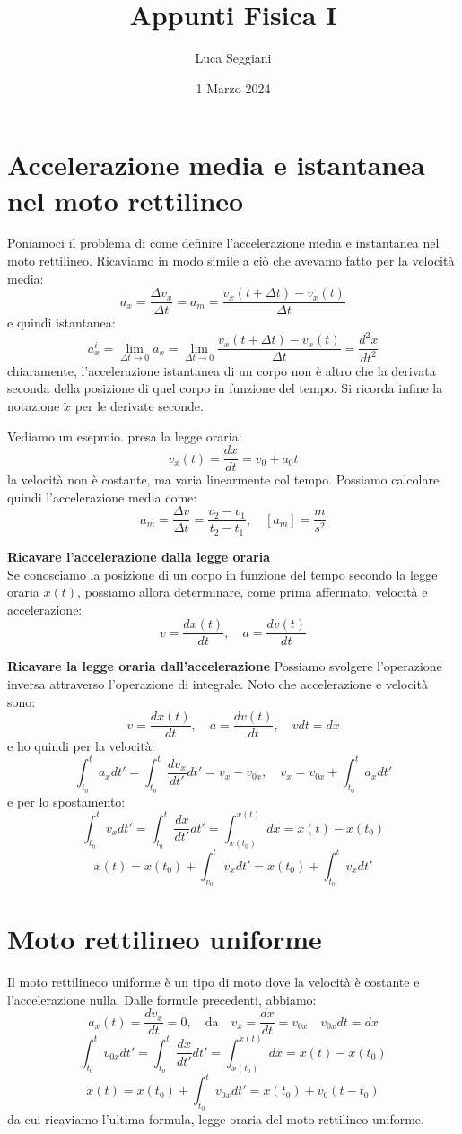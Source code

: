 \documentclass[a4paper,12pt]{article}
\title{Appunti Fisica I}
\author{Luca Seggiani}
\date{1 Marzo 2024}
\begin{document}
\maketitle
\section{Accelerazione media e istantanea nel moto rettilineo}
Poniamoci il problema di come definire l'accelerazione media e instantanea nel moto rettilineo. Ricaviamo in
modo simile a ciò che avevamo fatto per la velocità media:
$$ a_x = \frac{\Delta v_x}{\Delta t} = a_m = \frac{v_x(t+\Delta t) - v_x(t)}{\Delta t} $$
e quindi istantanea:
$$ a_x^i = \lim_{\Delta t \rightarrow 0} a_x = \lim_{\Delta t \rightarrow 0} \frac{v_x(t+\Delta t) - v_x(t)}{\Delta t} = \frac{d^2x}{dt^2} $$
chiaramente, l'accelerazione istantanea di un corpo non è altro che la derivata seconda della posizione di quel corpo
in funzione del tempo. Si ricorda infine la notazione $\ddot{x}$ per le derivate seconde.
\par\smallskip
Vediamo un esepmio. presa la legge oraria:
$$ v_x(t) = \frac{dx}{dt} = v_0 + a_0t $$
la velocità non è costante, ma varia linearmente col tempo. Possiamo calcolare quindi l'accelerazione media come:
$$ a_m = \frac{\Delta v}{\Delta t} = \frac{v_2 - v_1}{t_2- t_1}, \quad [a_m] = \frac{m}{s^2} $$
\par\medskip
\textbf{Ricavare l'accelerazione dalla legge oraria} \\
Se conosciamo la posizione di un corpo in funzione del tempo secondo la legge oraria $x(t)$, possiamo allora determinare,
come prima affermato, velocità e accelerazione:
$$ v = \frac{dx(t)}{dt}, \quad a = \frac{dv(t)}{dt} $$

\textbf{Ricavare la legge oraria dall'accelerazione}
Possiamo svolgere l'operazione inversa attraverso l'operazione di integrale. Noto che accelerazione e velocità
sono:
$$ v = \frac{dx(t)}{dt}, \quad a = \frac{dv(t)}{dt}, \quad vdt = dx $$
e ho quindi per la velocità:
$$ \int_{t_0}^t a_x dt' = \int_{t_0}^t \frac{dv_x}{dt'} dt' = v_x - v_{0x}, \quad v_x = v_{0x} + \int_{t_0}^t a_x dt' $$
e per lo spostamento:
$$ \int_{t_0}^t v_x dt' = \int_{t_0}^t \frac{dx}{dt'} dt' = \int_{x(t_0)}^{x(t)}dx = x(t) - x(t_0) $$
$$ x(t) = x(t_0) + \int_{v_0}^t v_x dt' = x(t_0)+ \int_{t_0}^{t} v_x dt' $$

\section{Moto rettilineo uniforme}
Il moto rettilineoo uniforme è un tipo di moto dove la velocità è costante e l'accelerazione nulla. Dalle
formule precedenti, abbiamo:
$$ a_x(t) = \frac{dv_x}{dt} = 0, \quad \mathrm{da} \quad v_x = \frac{dx}{dt} = v_{0x} \quad v_{0x}dt = dx $$
$$ \int_{t_0}^t v_{0x} dt' = \int_{t_0}^t \frac{dx}{dt'} dt' =  \int_{x(t_0)}^{x(t)}dx = x(t) - x(t_0) $$
$$ x(t) = x(t_0) + \int_{t_0}^{t} v_{0x} dt' = x(t_0) + v_0(t - t_0) $$
da cui ricaviamo l'ultima formula, legge oraria del moto rettilineo uniforme.
\end{document}
